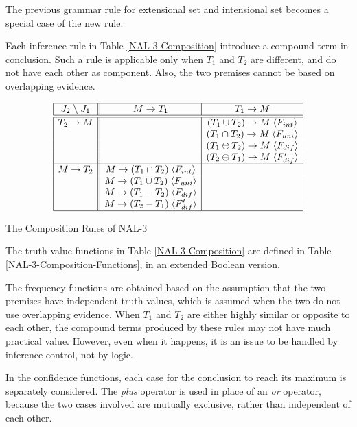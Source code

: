 The previous grammar rule for extensional set and intensional set becomes a special case of the new rule. 

Each inference rule in Table \ref{NAL-3-Composition} introduce a compound term in conclusion.  Such a rule is applicable only when $T_1$ and $T_2$ are different, and do not have each other as component. Also, the two premises cannot be based on overlapping evidence.

\begin{table}[htb]
\[\begin{array}{|c||c|c|} \hline 
J_2 \; \backslash \; J_1 & M \rightarrow T_1 & T_1 \rightarrow M\\
\hline \hline
T_2 \rightarrow M
  & & (T_1 \cup T_2)    \rightarrow M \; \langle F_{int}\rangle  \\
  & & (T_1 \cap T_2)    \rightarrow M \; \langle F_{uni}\rangle  \\
  & & (T_1 \ominus T_2) \rightarrow M \; \langle F_{dif}\rangle  \\
  & & (T_2 \ominus T_1) \rightarrow M \; \langle F'_{dif} \rangle  \\
\hline 
M \rightarrow T_2
  & M \rightarrow (T_1 \cap T_2) \; \langle F_{int}\rangle  & \\
  & M \rightarrow (T_1 \cup T_2) \; \langle F_{uni}\rangle  & \\
  & M \rightarrow (T_1 - T_2)    \; \langle F_{dif}\rangle  & \\
  & M \rightarrow (T_2 - T_1)    \; \langle F'_{dif} \rangle  & \\
\hline \end{array}\]
\caption{The Composition Rules of NAL-3}
\label{NAL-3-Composition}
\end{table}

The truth-value functions in Table \ref{NAL-3-Composition} are defined in Table \ref{NAL-3-Composition-Functions}, in an extended Boolean version. 

The frequency functions are obtained based on the assumption that the two premises have independent truth-values, which is assumed when the two do not use overlapping evidence. When $T_1$ and $T_2$ are either highly similar or opposite to each other, the compound terms produced by these rules may not have much practical value. However, even when it happens, it is an issue to be handled by inference control, not by logic.

In the confidence functions, each case for the conclusion to reach its maximum is separately considered. The \emph{plus} operator is used in place of an \emph{or} operator, because the two cases involved are mutually exclusive, rather than independent of each other. 

